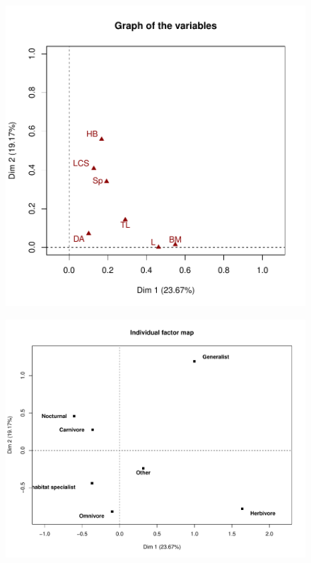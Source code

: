 \begin{figure}[h!]
\centering
\includegraphics[scale=0.75]{figures/chapter3/Graph_traits_variables}
\caption[]{\textbf{}}
\label{}
\end{figure}

\begin{figure}[h!]
\centering
\includegraphics[scale=0.75]{figures/chapter3/Individual_factor_map}
\caption[]{\textbf{}}
\label{}
\end{figure}

